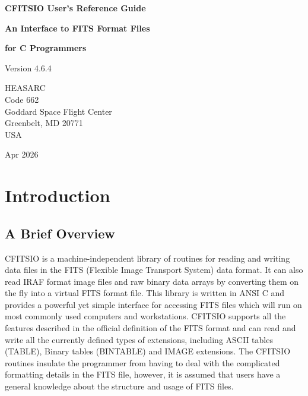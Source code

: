 \documentclass[11pt]{book}
\begin{document}

\begin{titlepage}
\normalsize
\vspace*{4.0cm}
\begin{center}
{\Huge \bf CFITSIO User's Reference Guide}\\
\end{center}
\medskip 
\medskip 
\begin{center}
{\LARGE \bf An Interface to FITS Format Files}\\
\end{center}
\begin{center}
{\LARGE \bf for C Programmers}\\
\end{center}
\medskip
\medskip
\begin{center}
{\Large Version 4.6.4\\}
\end{center}
\bigskip
\vskip 2.5cm
\begin{center}
{HEASARC\\
Code 662\\
Goddard Space Flight Center\\
Greenbelt, MD 20771\\
USA}
\end{center}

\vfill
\bigskip
\begin{center}
{\Large Apr 2026\\}
\end{center}
\vfill
\end{titlepage}

\clearpage

\tableofcontents
\chapter{Introduction }


\section{ A Brief Overview}

CFITSIO is a machine-independent library of routines for reading and
writing data files in the FITS (Flexible Image Transport System) data
format.  It can also read IRAF format image files and raw binary data
arrays by converting them on the fly into a virtual FITS format file.
This library is written in ANSI C and provides a powerful yet simple
interface for accessing FITS files which will run on most commonly used
computers and workstations.  CFITSIO supports all the features
described in the official definition of the FITS format and can
read and write all the currently defined types of extensions, including
ASCII tables (TABLE), Binary tables (BINTABLE) and IMAGE extensions.
The CFITSIO routines insulate the programmer from having to deal with
the complicated formatting details in the FITS file, however, it is
assumed that users have a general knowledge about the structure and
usage of FITS files.
\end{document}
